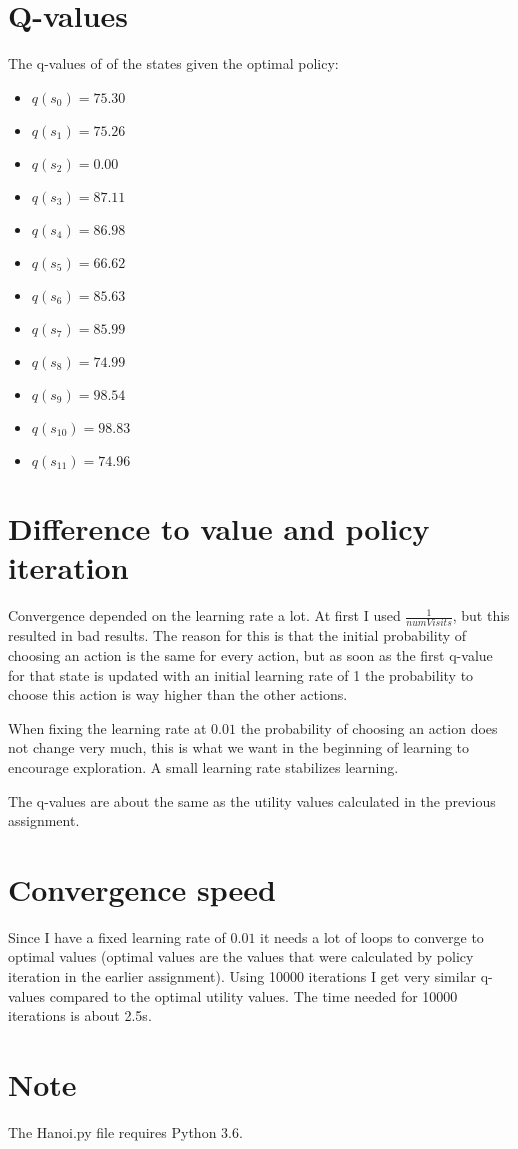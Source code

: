 \documentclass[a4paper]{article}
\begin{document}
\section{Q-values}

The q-values of of the states given the optimal policy:
\begin{multicols}{2}
\begin{itemize}
\item $q(s_0) = 75.30 $
\item $q(s_1) = 75.26 $
\item $q(s_2) = 0.00 $
\item $q(s_3) = 87.11 $
\item $q(s_4) = 86.98 $
\item $q(s_5) = 66.62 $
\item $q(s_6) = 85.63 $
\item $q(s_7) = 85.99 $
\item $q(s_8) = 74.99 $
\item $q(s_9) = 98.54 $
\item $q(s_{10}) = 98.83 $
\item $q(s_{11}) = 74.96 $
\end{itemize}
\end{multicols}

\section{Difference to value and policy iteration}
Convergence depended on the learning rate a lot. At first I used $\frac{1}{numVisits}$, but this resulted in bad results. The reason for this is that the initial probability of choosing an action is the same for every action, but as soon as the first q-value for that state is updated with an initial learning rate of 1 the probability to choose this action is way higher than the other actions. 

When fixing the learning rate at $0.01$ the probability of choosing an action does not change very much, this is what we want in the beginning of learning to encourage exploration. A small learning rate stabilizes learning.

The q-values are about the same as the utility values calculated in the previous assignment.

\section{Convergence speed}
Since I have a fixed learning rate of $0.01$ it needs a lot of loops to converge to optimal values (optimal values are the values that were calculated by policy iteration in the earlier assignment). Using 10000 iterations I get very similar q-values compared to the optimal utility values. The time needed for 10000 iterations is about 2.5s.

\section{Note}
The Hanoi.py file requires Python 3.6.
\end{document}
